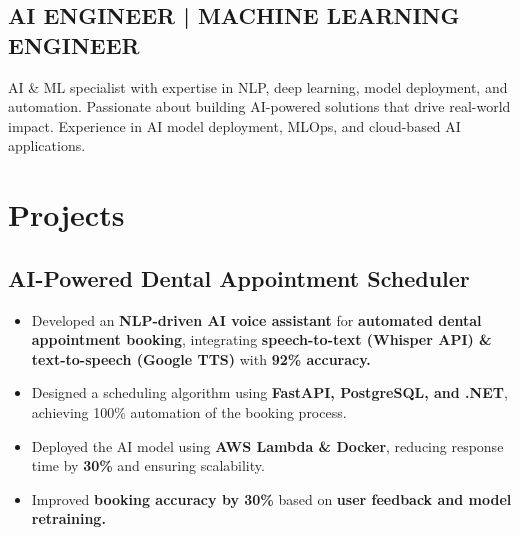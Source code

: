 \documentclass[a4paper,hidelinks]{deedy-resume} %
\begin{document}
\begin{minipage}[t]{0.66\textwidth} %


\subsection{AI ENGINEER | MACHINE LEARNING ENGINEER
}
AI \& ML specialist with expertise in NLP, deep learning, model deployment, and automation. Passionate about building AI-powered solutions that drive real-world impact. Experience in AI model deployment, MLOps, and cloud-based AI applications.



\section{Projects} 

\subsection{AI-Powered Dental Appointment Scheduler}
\small 
\begin{itemize}
    \item Developed an \textbf{NLP-driven AI voice assistant} for \textbf{automated dental appointment booking}, integrating \textbf{speech-to-text (Whisper API) \& text-to-speech (Google TTS)} with \textbf{92\% accuracy.}
    \item Designed a scheduling algorithm using \textbf{FastAPI, PostgreSQL, and .NET}, achieving 100\% automation of the booking process.
  
    \item Deployed the AI model using \textbf{AWS Lambda \& Docker}, reducing response time by \textbf{30\%} and ensuring scalability.
    \item Improved \textbf{booking accuracy by 30\%} based on \textbf{user feedback and model retraining.}


\end{itemize}
\end{minipage}
\end{document}
